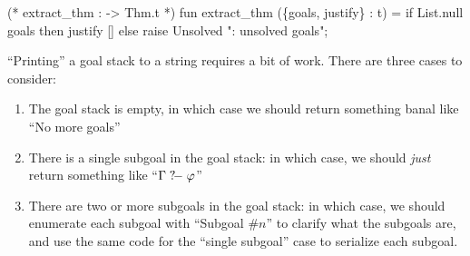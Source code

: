 \nwenddocs{}\endmoddef\nwstartdeflinemarkup{}\nwenddeflinemarkup
(* extract_thm :  -> Thm.t *)
fun extract_thm (\{goals, justify\} : t) = 
  if List.null goals
  then justify []
  else raise Unsolved ": unsolved goals";
\eatline
{}\nwendcode{}\nwdocspar
\begin{node}
``Printing'' a goal stack to a string requires a bit of work.
There are three cases to consider:
\begin{enumerate}
\item The goal stack is empty, in which case we should return
  something banal like ``No more goals''
\item There is a single subgoal in the goal stack: in which case, we
  should \emph{just} return something like ``$\Gamma\mathrel{?\!-}\varphi$''
\item There are two or more subgoals in the goal stack: in which case,
  we should enumerate each subgoal with ``Subgoal \#$n$'' to clarify
  what the subgoals are, and use the same code for the ``single
  subgoal'' case to serialize each subgoal.
\end{enumerate}
\end{node}

